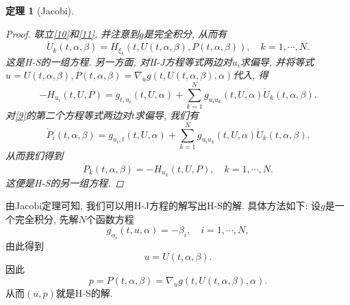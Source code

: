 \documentclass[12pt,a4paper]{article}
\newtheorem{theorem}{定理}[section]
\begin{document}
\begin{theorem}[Jacobi]
\begin{proof}
        联立\eqref{10}和\eqref{11}, 并注意到$g$是完全积分, 从而有 
        \begin{equation*}
            \dot U_k(t, \alpha, \beta) =H_{\xi_k}(t, U(t, \alpha, \beta), P(t, \alpha, \beta)), \quad k = 1, \cdots, N.
        \end{equation*}
        这是H-S的一组方程. 另一方面, 对H-J方程等式两边对$u_i$求偏导, 并将等式$u = U(t, \alpha, \beta), P(t, \alpha, \beta) = \nabla_ug(t, U(t, \alpha, \beta), \alpha)$代入, 得 
        \begin{equation*}
            -H_{u_i}(t, U, P) = g_{t, u_i}(t, U, \alpha) + \sum_{k = 1}^Ng_{u_iu_k}(t, U, \alpha)\dot U_k(t, \alpha, \beta).
        \end{equation*}
        对\eqref{9}的第二个方程等式两边对$t$求偏导, 我们有 
        \begin{equation*}
            \dot P_i(t, \alpha, \beta) = g_{u_i, t}(t, U, \alpha) + \sum_{k = 1}^Ng_{u_iu_k}(t, U, \alpha)\dot U_k(t, \alpha, \beta).
        \end{equation*}
        从而我们得到 
        \begin{equation*}
            \dot P_k(t, \alpha, \beta) = -H_{u_k}(t, U, P), \quad k = 1, \cdots, N.
        \end{equation*}
        这便是H-S的另一组方程.
    \end{proof}
\end{theorem}

由Jacobi定理可知, 我们可以用H-J方程的解写出H-S的解. 具体方法如下: 设$g$是一个完全积分, 先解$N$个函数方程 
\begin{equation*}
    g_{\alpha_i}(t, u, \alpha) = -\beta_i, \quad i = 1, \cdots, N,
\end{equation*}
由此得到 
\begin{equation}\label{12}
    u = U(t, \alpha, \beta). 
\end{equation}
因此
\begin{equation}\label{13}
    p = P(t, \alpha, \beta) = \nabla_ug(t, U(t, \alpha, \beta), \alpha).
\end{equation}
从而$(u, p)$就是H-S的解.
\end{document}
